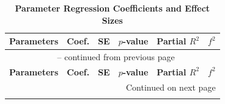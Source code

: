 \begingroup
    \renewcommand{\arraystretch}{1.0}
    \footnotesize
    \begin{longtable}{l r r r r r}
        \caption{\textbf{Parameter Regression Coefficients and Effect Sizes}}
        \label{tab:param_regression_main} \\
        \toprule
        \textbf{Parameters} & 
        \multicolumn{1}{c}{\textbf{Coef.}} & 
        \multicolumn{1}{c}{\textbf{SE}} & 
        \multicolumn{1}{c}{\textbf{$p$-value}} & 
        \multicolumn{1}{c}{\textbf{Partial $R^2$}} & 
        \multicolumn{1}{c}{\textbf{$f^2$}} \\
        \midrule
        \endfirsthead

        \multicolumn{6}{c}{{\tablename\ \thetable{} -- continued from previous page}} \\
        \toprule
        \textbf{Parameters} & 
        \multicolumn{1}{c}{\textbf{Coef.}} & 
        \multicolumn{1}{c}{\textbf{SE}} & 
        \multicolumn{1}{c}{\textbf{$p$-value}} & 
        \multicolumn{1}{c}{\textbf{Partial $R^2$}} & 
        \multicolumn{1}{c}{\textbf{$f^2$}} \\
        \midrule
        \endhead

        \midrule
        \multicolumn{6}{r}{{Continued on next page}} \\
        \endfoot


\end{longtable}
